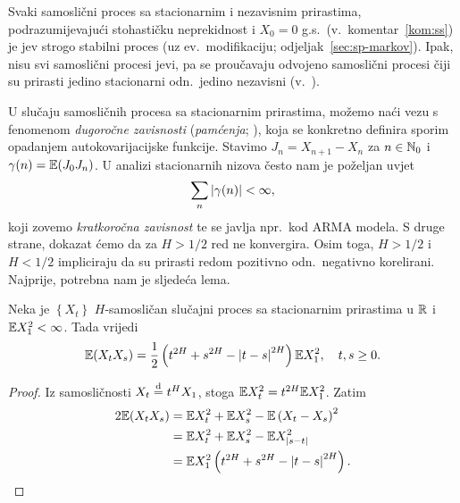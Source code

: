 \documentclass[main.tex]{subfiles}
\begin{document}
Svaki samoslični proces sa stacionarnim i nezavisnim prirastima, podrazumijevajući stohastičku neprekidnost i \( X_0=0 \) g.s.\ (v.\ komentar~\ref{kom:ss}) je
\levy jev strogo stabilni proces (uz ev.\ modifikaciju; odjeljak~\ref{sec:sp-markov}).
Ipak, nisu svi samoslični procesi \levy jevi, pa se proučavaju odvojeno samoslični procesi čiji su prirasti
jedino stacionarni odn.\ jedino nezavisni (v.~\cite{em}).

U slučaju samosličnih procesa sa stacionarnim prirastima, možemo naći vezu s fenomenom
\emph{dugoročne zavisnosti} (\emph{pamćenja}; \cite[]{em}), koja se konkretno
definira sporim opadanjem autokovarijacijske funkcije. Stavimo \( J_n = X_{n+1}-X_n \) za \( n \in \mathbb{N}_0 \)
i \( \gamma(n) = \mathbb{E}(J_0J_n) \). U analizi stacionarnih nizova često nam je poželjan uvjet
\[
	\sum_n \left| {\gamma(n)} \right| < \infty,
\]
koji zovemo \emph{kratkoročna zavisnost} te se javlja npr.\ kod ARMA modela. S druge strane, dokazat ćemo da
za \( H > 1/2 \) red ne konvergira. Osim toga, \( H>1/2 \) i \( H<1/2 \) impliciraju da su
prirasti redom pozitivno odn.\ negativno korelirani.
Najprije, potrebna nam je sljedeća lema.

\begin{lema}\label{lema:sssi}
	Neka je \( \left\{ X_t \right\} \) \( H \)-samosličan slučajni proces sa stacionarnim prirastima
	u \( \mathbb{R} \) i \( \mathbb{E} X_1^2 < \infty \). Tada vrijedi
	\begin{equation}
		\mathbb{E}(X_tX_s) = \frac 12 \left( t^{2H}+s^{2H}-\left| {t-s} \right|^{2H} \right) \mathbb{E} X_1^2
		, \quad t,s \ge 0.
	\end{equation}
\end{lema}

\begin{proof}
	Iz samosličnosti \( X_t \stackrel{\mathrm d}{=} t^HX_1 \), stoga \( \mathbb{E} X_t^2 = t^{2H}\mathbb{E} X_1^2 \). Zatim
	\begin{align}
		2 \E(X_tX_s) & =  \E X_t^2 + \E X_s^2 - \E\left( X_t-X_s \right)^2          \\
		             & =  \E X_t^2 + \E X_s^2 - \E X_{\abs{s-t}} ^2                 \\
		             & =  \E X_1^2 \left( t^{2H} + s^{2H} - \abs{t-s}^{2H} \right). %
	\end{align}
\end{proof}
\end{document}
